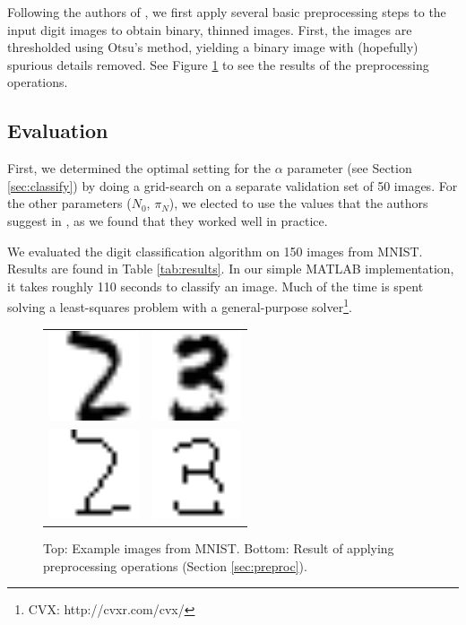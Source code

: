 \documentclass[oribibl]{llncs}
\begin{document}
Following the authors of \cite{Hinton92adaptiveelastic}, we first apply several basic preprocessing steps to the input digit images to obtain binary, thinned images.
First, the images are thresholded using Otsu's method, yielding a binary image with (hopefully) spurious details removed.
See Figure \ref{fig:mnist_imgs} to see the results of the preprocessing operations.

\subsection{Evaluation}

First, we determined the optimal setting for the $\alpha$ parameter (see Section \ref{sec:classify}) by doing a grid-search on a separate validation set of 50 images.
For the other parameters ($N_0$, $\pi_N$), we elected to use the values that the authors suggest in \cite{Hinton92adaptiveelastic}, as we found that they worked well in practice.

We evaluated the digit classification algorithm on 150 images from MNIST.
Results are found in Table \ref{tab:results}.
In our simple MATLAB implementation, it takes roughly 110 seconds to classify an image.
Much of the time is spent solving a least-squares problem with a general-purpose solver\footnote{CVX: http://cvxr.com/cvx/}.


\begin{figure}
\centering
\begin{tabular}{cc}
\includegraphics[width=.2\linewidth]{figs/Imnist_3749.png} & \includegraphics[width=.2\linewidth]{figs/Imnist_1960.png} \\
\includegraphics[width=.2\linewidth]{figs/Imnist_proc_1.png} & \includegraphics[width=.2\linewidth]{figs/Imnist_proc_16.png} \\
\end{tabular}
\caption{Top: Example images from MNIST. Bottom: Result of applying preprocessing operations (Section \ref{sec:preproc}).}
\label{fig:mnist_imgs}
\end{figure}
\end{document}
